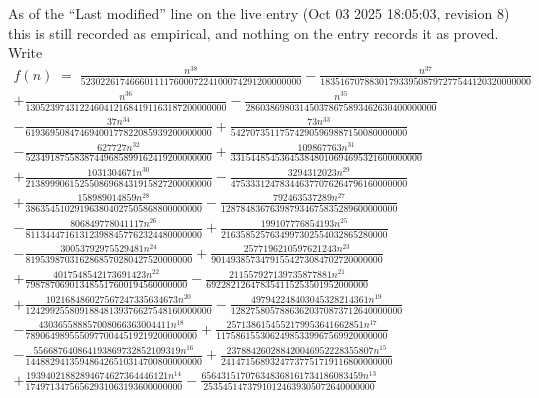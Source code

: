 \documentclass[11pt,a4paper]{article}
\theoremstyle{plain}
\theoremstyle{definition}
\begin{document}
As of the ``Last modified'' line on the live entry (Oct 03 2025 18:05:03, revision 8) this is still
recorded as empirical, and nothing on the entry records it as proved. Write
\begin{multline*}
f(n)\;=\;\frac{n^{38}}{523022617466601111760007224100074291200000000} - \frac{n^{37}}{1835167078830179339508797277544120320000000} \\
+ \frac{n^{36}}{13052397431224604121684191163187200000000} - \frac{n^{35}}{286038698031450378675893462630400000000} \\
- \frac{37 n^{34}}{61936950847469400177822085939200000000} + \frac{73 n^{33}}{542707351175742905969887150080000000} \\
- \frac{627727 n^{32}}{52349187558387449685899162419200000000} + \frac{109867763 n^{31}}{331544854536453848010694695321600000000} \\
+ \frac{1031304671 n^{30}}{21389990615255086968431915827200000000} - \frac{3294312023 n^{29}}{475333124783446377076264796160000000} \\
+ \frac{158989014859 n^{28}}{386354510291963804027505868800000000} - \frac{792463537289 n^{27}}{128784836763987934675835289600000000} \\
- \frac{806849778041117 n^{26}}{811344471613123988457762324480000000} + \frac{199107776854193 n^{25}}{2163585257634997302554032865280000} \\
- \frac{30053792975529481 n^{24}}{8195398703162868570280427520000000} + \frac{2577196210597621243 n^{23}}{90149385734791554273084702720000000} \\
+ \frac{4017548542173691423 n^{22}}{798787069013485517600194560000000} - \frac{211557927139735877881 n^{21}}{692282126478354115253501952000000} \\
+ \frac{102168486027567247335634673 n^{20}}{12429925580918848139376627548160000000} - \frac{497942248403045328214361 n^{19}}{12827580578863620370873712640000000} \\
- \frac{430365588857008066363004411 n^{18}}{78906498955509770044519219200000000} + \frac{2571386154552179953641662851 n^{17}}{11758615530624985339967569920000000} \\
- \frac{556687640864193869732852109319 n^{16}}{144882941359486426510314700800000000} + \frac{237884260288420046952228355807 n^{15}}{24147156893247737751719116800000000} \\
+ \frac{19394021882894674627364446121 n^{14}}{17497134756562931063193600000000} - \frac{656431517076348368161734186083459 n^{13}}{25354514737910124639305072640000000} \\

\end{multline*}
\end{document}
